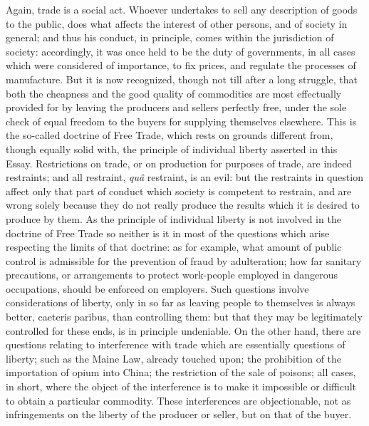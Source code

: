 \documentclass[12pt]{report}
\begin{document}
Again, trade is a social act. Whoever undertakes to sell any description of goods to the public, does what affects the interest of other persons, and of society in general; and thus his conduct, in principle, comes within the jurisdiction of society: accordingly, it was once held to be the duty of governments, in all cases which were considered of importance, to fix prices, and regulate the processes of manufacture. But it is now recognized, though not till after a long struggle, that both the cheapness and the good quality of commodities are most effectually provided for by leaving the producers and sellers perfectly free, under the sole check of equal freedom to the buyers for supplying themselves elsewhere. This is the so-called doctrine of Free Trade, which rests on grounds different from, though equally solid with, the principle of individual liberty asserted in this Essay. Restrictions on trade, or on production for purposes of trade, are indeed restraints; and all restraint, \emph{qu\^a} restraint, is an evil: but the restraints in question affect only that part of conduct which society is competent to restrain, and are wrong solely because they do not really produce the results which it is desired to produce by them. As the principle of individual liberty is not involved in the doctrine of Free Trade so neither is it in most of the questions which arise respecting the limits of that doctrine: as for example, what amount of public control is admissible for the prevention of fraud by adulteration; how far sanitary precautions, or arrangements to protect work-people employed in dangerous occupations, should be enforced on employers. Such questions involve considerations of liberty, only in so far as leaving people to themselves is always better, caeteris paribus, than controlling them: but that they may be legitimately controlled for these ends, is in principle undeniable. On the other hand, there are questions relating to interference with trade which are essentially questions of liberty; such as the Maine Law, already touched upon; the prohibition of the importation of opium into China; the restriction of the sale of poisons; all cases, in short, where the object of the interference is to make it impossible or difficult to obtain a particular commodity. These interferences are objectionable, not as infringements on the liberty of the producer or seller, but on that of the buyer.
\end{document}
